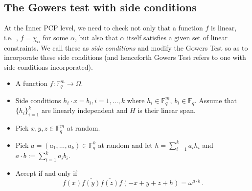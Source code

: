 \documentclass[10pt]{article}
\theoremstyle{definition}
\providecommand{\ie}{i.e.\ }
\numberwithin{equation}{section}
\newcommand\F{\mathbb{F}}
\renewcommand{\mapsto}{\to}
\begin{document}
\subsection{The Gowers test with side conditions}

At the Inner PCP level, we need to check not only that a function $f$ is linear, \ie, $f= \chi_\alpha$ for some
$\alpha$, but also that $\alpha$ itself satisfies a given set of linear constraints. We call these
as \emph{side conditions} and modify the Gowers Test so as to incorporate these side conditions (and henceforth Gowers Test refers to one with side conditions incorporated).

\medskip
{}
\begin{itemize}
\item A function $f: \F_q^m \mapsto \Omega$.
\item Side conditions $h_i \cdot x = b_i, i = 1,\ldots, k$ where $h_i \in \F_q^m, \ b_i \in \F_q$. Assume that $\{h_i\}_{i=1}^k$ are linearly independent and  $H$ is their
    linear span.
\end{itemize}
\begin{itemize}
\item Pick $x, y, z \in \F_q^m$ at random.
\item Pick $a = (a_1,\ldots, a_k) \in \F_q^k$ at random and let $h= \sum_{i=1}^k a_i h_i$ and
      $a\cdot b := \sum_{i=1}^k a_i b_i$.
\item Accept if and only if
  $$f(x) \overline{f(y)}\overline{f(z)} f(-x+y+z+h) = \omega^{a\cdot b}\,. $$
\end{itemize}
\end{document}
